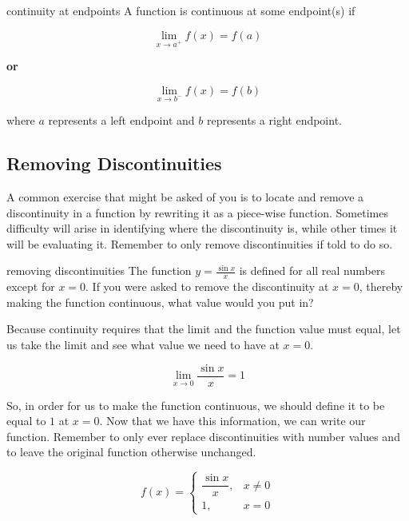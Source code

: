 \begin{definition}{continuity at endpoints}
    A function is continuous at some endpoint(s) if
    
    \[ \lim_{x \to a^+} f \left( x \right) = f \left( a \right) \]
    \begin{center}
        \textbf{or}
    \end{center}
    \[ \lim_{x \to b^-} f \left( x \right) = f \left( b \right) \]
    
    where \( a \) represents a left endpoint and \( b \) represents a right endpoint.
\end{definition}

\subsection{Removing Discontinuities}

A common exercise that might be asked of you is to locate and remove a discontinuity in a function by rewriting it as a piece-wise function. Sometimes difficulty will arise in identifying where the discontinuity is, while other times it will be evaluating it. Remember to only remove discontinuities if told to do so.

\begin{example}{removing discontinuities}
    The function \( y = \frac{\sin{x}}{x} \) is defined for all real numbers except for \( x = 0 \). If you were asked to remove the discontinuity at \( x = 0 \), thereby making the function continuous, what value would you put in?
    
    Because continuity requires that the limit and the function value must equal, let us take the limit and see what value we need to have at \( x = 0 \).
    
    \[ \lim_{x \to 0} \dfrac{\sin{x}}{x} = 1 \]
    
    So, in order for us to make the function continuous, we should define it to be equal to \( 1 \) at \( x = 0 \). Now that we have this information, we can write our function. Remember to only ever replace discontinuities with number values and to leave the original function otherwise unchanged.
    
    \[
    f \left( x \right) = \begin{cases}
        \dfrac{\sin{x}}{x}, & x \ne 0 \\
        1, & x = 0
    \end{cases}
    \]
\end{example}

